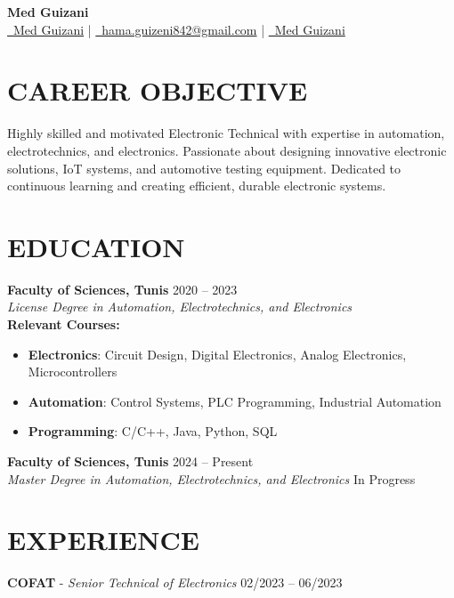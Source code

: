 \documentclass[a4paper,9pt]{extarticle}
\begin{document}
\pagestyle{empty}

\begin{center}
\textbf{\huge Med Guizani}\\[2pt] %
\href{https://github.com/Guizaa22}{\faGithub\ Med Guizani}
 | \href{mailto:hama.guizeni842@gmail.com}{\faEnvelopeO\ hama.guizeni842@gmail.com}
 | \href{https://www.linkedin.com/in/guizani-mohamed-b66802250/}{\faLinkedin\ Med Guizani}
\end{center}

\section*{CAREER OBJECTIVE}
Highly skilled and motivated Electronic Technical with expertise in automation, electrotechnics, and electronics. Passionate about designing innovative electronic solutions, IoT systems, and automotive testing equipment. Dedicated to continuous learning and creating efficient, durable electronic systems.

\section*{EDUCATION}
\textbf{Faculty of Sciences, Tunis} \hfill 2020 -- 2023\\ 
\textit{License Degree in Automation, Electrotechnics, and Electronics} \\
\textbf{Relevant Courses:}
\begin{itemize}
            \item \textbf{Electronics}: Circuit Design, Digital Electronics, Analog Electronics, Microcontrollers
            \item \textbf{Automation}: Control Systems, PLC Programming, Industrial Automation
            \item \textbf{Programming}: C/C++, Java, Python, SQL
\end{itemize}
\textbf{Faculty of Sciences, Tunis} \hfill 2024 -- Present\\
\textit{Master Degree in Automation, Electrotechnics, and Electronics} \hfill In Progress\\

\section*{EXPERIENCE}
\textbf{COFAT} - \textit{Senior Technical of Electronics} \hfill 02/2023 -- 06/2023 
\end{document}
